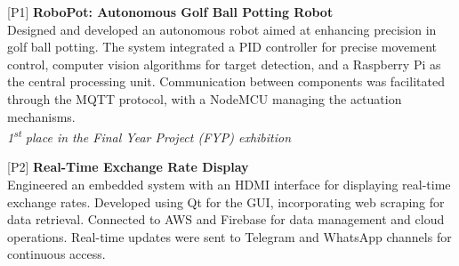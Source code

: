

\begin{cventries}
\begin{rSection}{}
{\vspace{-0.5em}\hspace{-1.5em}[P1]\hspace{1em}\bodyfont\bfseries\color{darktext} {RoboPot: Autonomous Golf Ball Potting Robot \hspace{1em} \href{https://github.com/MortazaHassani/RoboPutter}{\Large{\faGithub}}}}
\\\hspace{1.2em}Designed and developed an autonomous robot aimed at enhancing
precision in golf ball potting. The system integrated a PID controller for precise movement control, computer vision
algorithms for target detection, and a Raspberry Pi as the central processing unit. Communication between components
was facilitated through the MQTT protocol, with a NodeMCU managing the actuation mechanisms. 
\\  \hspace{0.5em} \emph{1\textsuperscript{st} place in the Final Year Project (FYP) exhibition}
\vspace{-0.2em}
\end{rSection}

\begin{rSection}{}
{\hspace{-1.5em}[P2]\hspace{1em}}{\bodyfont\bfseries\color{darktext} {Real-Time Exchange Rate Display \hspace{1em} \href{https://www.linkedin.com/posts/mortazahassani_currency-rates-board-uml-and-images-activity-7166390758810312704-n4Oi} {\Large{\faLaptop}}}}
\\\hspace{1.2em}Engineered an embedded system with an HDMI interface for displaying real-time exchange rates. Developed using Qt for the GUI, incorporating web scraping for data retrieval. Connected to AWS and Firebase for data management and cloud operations. Real-time updates were sent to Telegram and WhatsApp channels for continuous access.
\vspace{-0.2em}
\end{rSection}


\end{cventries}
